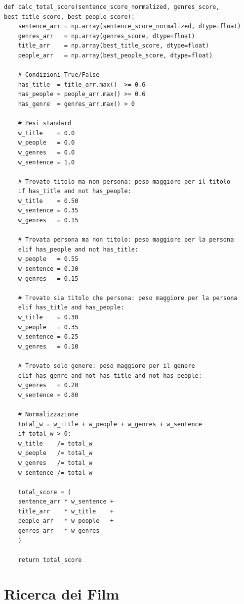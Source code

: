 \documentclass{article}
\begin{document}
\begin{lstlisting}
def calc_total_score(sentence_score_normalized, genres_score, best_title_score, best_people_score):
	sentence_arr = np.array(sentence_score_normalized, dtype=float)
	genres_arr   = np.array(genres_score, dtype=float)
	title_arr    = np.array(best_title_score, dtype=float)
	people_arr   = np.array(best_people_score, dtype=float)
	
	# Condizioni True/False
	has_title  = title_arr.max()  >= 0.6
	has_people = people_arr.max() >= 0.6 
	has_genre  = genres_arr.max() > 0
	
	# Pesi standard
	w_title    = 0.0
	w_people   = 0.0
	w_genres   = 0.0
	w_sentence = 1.0
	
	# Trovato titolo ma non persona: peso maggiore per il titolo
	if has_title and not has_people:
	w_title    = 0.50
	w_sentence = 0.35
	w_genres   = 0.15
	
	# Trovata persona ma non titolo: peso maggiore per la persona
	elif has_people and not has_title:
	w_people   = 0.55
	w_sentence = 0.30
	w_genres   = 0.15
	
	# Trovato sia titolo che persona: peso maggiore per la persona
	elif has_title and has_people:
	w_title    = 0.30
	w_people   = 0.35
	w_sentence = 0.25
	w_genres   = 0.10
	
	# Trovato solo genere: peso maggiore per il genere
	elif has_genre and not has_title and not has_people:
	w_genres   = 0.20
	w_sentence = 0.80
	
	# Normalizzazione
	total_w = w_title + w_people + w_genres + w_sentence
	if total_w > 0:
	w_title    /= total_w
	w_people   /= total_w
	w_genres   /= total_w
	w_sentence /= total_w
	
	total_score = (
	sentence_arr * w_sentence +
	title_arr    * w_title    +
	people_arr   * w_people   +
	genres_arr   * w_genres
	)
	
	return total_score
\end{lstlisting}

\section{Ricerca dei Film}
\end{document}
